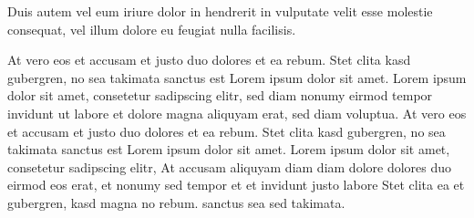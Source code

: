 \documentclass[]{../metanetpaper}
\begin{document}
\begin{Parallel}[c]{80mm}{80mm}
{    Duis autem vel eum iriure dolor in hendrerit in vulputate velit esse molestie consequat, vel illum dolore eu feugiat nulla facilisis.   

    At vero eos et accusam et justo duo dolores et ea rebum. Stet clita kasd gubergren, no sea takimata sanctus est Lorem ipsum dolor sit amet. Lorem ipsum dolor sit amet, consetetur sadipscing elitr, sed diam nonumy eirmod tempor invidunt ut labore et dolore magna aliquyam erat, sed diam voluptua. At vero eos et accusam et justo duo dolores et ea rebum. Stet clita kasd gubergren, no sea takimata sanctus est Lorem ipsum dolor sit amet. Lorem ipsum dolor sit amet, consetetur sadipscing elitr, At accusam aliquyam diam diam dolore dolores duo eirmod eos erat, et nonumy sed tempor et et invidunt justo labore Stet clita ea et gubergren, kasd magna no rebum. sanctus sea sed takimata.
  }

\end{Parallel}
\end{document}
